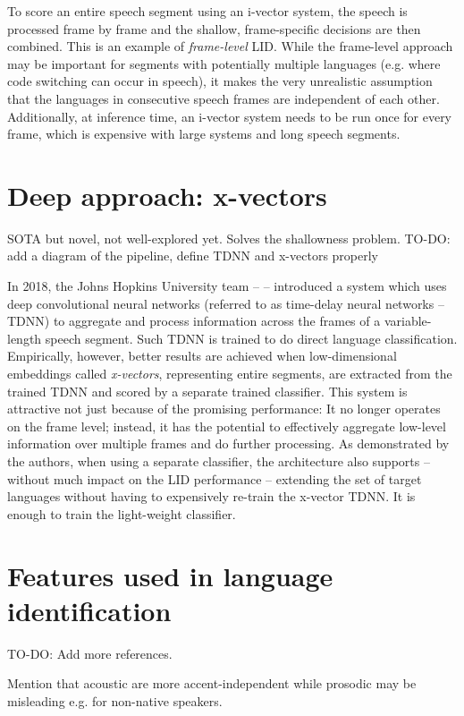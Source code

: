 \documentclass[bsc,frontabs,twoside,singlespacing,parskip,deptreport]{infthesis}
\begin{document}
{{    To score an entire speech segment using an i-vector system, the speech is processed frame by frame and the shallow, frame-specific decisions are then combined. This is an example of \textit{frame-level} LID. While the frame-level approach may be important for segments with potentially multiple languages (e.g. where code switching can occur in speech), it makes the very unrealistic assumption that the languages in consecutive speech frames are independent of each other. Additionally, at inference time, an i-vector system needs to be run once for every frame, which is expensive with large systems and long speech segments.
  }
  \section{Deep approach: x-vectors}{
    SOTA but novel, not well-explored yet. Solves the shallowness problem.
    TO-DO: add a diagram of the pipeline, define TDNN and x-vectors properly
    
    In 2018, the Johns Hopkins University team -- \cite{Snyder_et_al_2018} -- introduced a system which uses deep convolutional neural networks (referred to as time-delay neural networks -- TDNN) to aggregate and process information across the frames of a variable-length speech segment. Such TDNN is trained to do direct language classification. Empirically, however, better results are achieved when low-dimensional embeddings called \textit{x-vectors}, representing entire segments, are extracted from the trained TDNN and scored by a separate trained classifier. This system is attractive not just because of the promising performance: It no longer operates on the frame level; instead, it has the potential to effectively aggregate low-level information over multiple frames and do further processing. As demonstrated by the authors, when using a separate classifier, the architecture also supports -- without much impact on the LID performance -- extending the set of target languages without having to expensively re-train the x-vector TDNN. It is enough to train the light-weight classifier.
  }
  \section{Features used in language identification}{
    TO-DO: Add more references.

    Mention that acoustic are more accent-independent while prosodic may be misleading e.g. for non-native speakers.

}}
\end{document}

